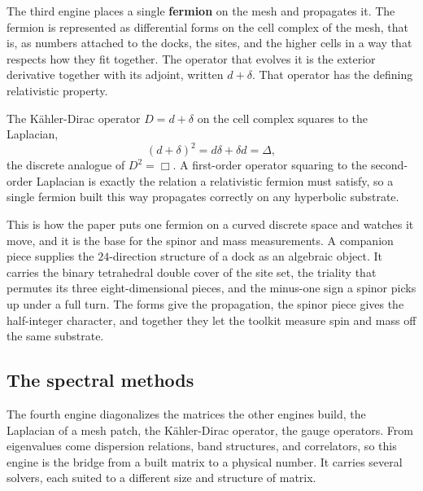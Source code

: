 The third engine places a single \textbf{fermion} on the mesh and propagates it. The fermion is represented as differential forms on the cell complex of the mesh, that is, as numbers attached to the docks, the sites, and the higher cells in a way that respects how they fit together. The operator that evolves it is the exterior derivative together with its adjoint, written $d + \delta$. That operator has the defining relativistic property.

\begin{proposition}
The K\"ahler-Dirac operator $D = d + \delta$ on the cell complex squares to the Laplacian,
\[
(d + \delta)^2 = d\delta + \delta d = \Delta,
\]
the discrete analogue of $D^2 = \Box$. A first-order operator squaring to the second-order Laplacian is exactly the relation a relativistic fermion must satisfy, so a single fermion built this way propagates correctly on any hyperbolic substrate.
\end{proposition}

This is how the paper puts one fermion on a curved discrete space and watches it move, and it is the base for the spinor and mass measurements. A companion piece supplies the $24$-direction structure of a dock as an algebraic object. It carries the binary tetrahedral double cover of the site set, the triality that permutes its three eight-dimensional pieces, and the minus-one sign a spinor picks up under a full turn. The forms give the propagation, the spinor piece gives the half-integer character, and together they let the toolkit measure spin and mass off the same substrate.

\subsection{The spectral methods}

The fourth engine diagonalizes the matrices the other engines build, the Laplacian of a mesh patch, the K\"ahler-Dirac operator, the gauge operators. From eigenvalues come dispersion relations, band structures, and correlators, so this engine is the bridge from a built matrix to a physical number. It carries several solvers, each suited to a different size and structure of matrix.

